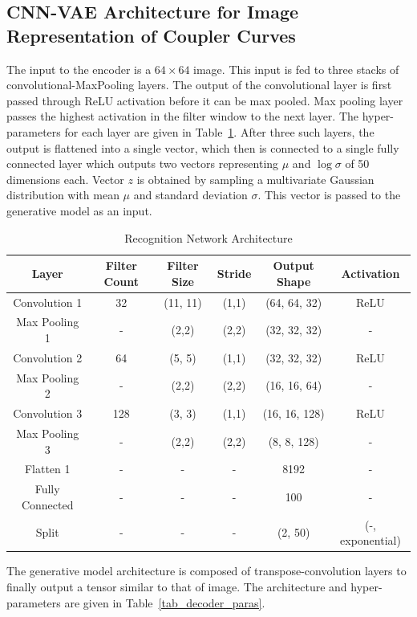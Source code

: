 \subsection{CNN-VAE Architecture for Image Representation of Coupler Curves}
The input to the encoder is a $64\times64$ image. This input is fed to three stacks of convolutional-MaxPooling layers. The output of the convolutional layer is first passed through ReLU activation before it can be max pooled. Max pooling layer passes the highest activation in the filter window to the next layer. The hyper-parameters for each layer are given in Table~\ref{tab_encoder_paras}. After three such layers, the output is flattened into a single vector, which then is connected to a single fully connected layer which outputs two vectors representing $\mu$ and $\log\sigma$ of 50 dimensions each. Vector $z$ is obtained by sampling a multivariate Gaussian distribution with mean $\mu$ and standard deviation $\sigma$. This vector is passed to the generative model as an input.

\begin{table}
  \caption{Recognition Network Architecture}
\centering
\label{tab_encoder_paras}
\begin{tabular}{cccccc}
\hline
  Layer & Filter Count & Filter Size & Stride & Output Shape & Activation\\
\hline
  Convolution 1 & 32 & (11, 11) & (1,1) & (64, 64, 32) & ReLU \\
  Max Pooling 1 & - & (2,2) & (2,2) & (32, 32, 32) & -  \\
  Convolution 2 & 64 & (5, 5) & (1,1) & (32, 32, 32) & ReLU   \\
  Max Pooling 2 & - & (2,2) & (2,2) & (16, 16, 64) & - \\
  Convolution 3 & 128 & (3, 3) & (1,1) & (16, 16, 128) & ReLU   \\
  Max Pooling 3 & - & (2,2) & (2,2) & (8, 8, 128) & - \\
  Flatten 1 & - & - & - & 8192 & - \\
  Fully Connected & - & - & - & 100 & - \\
  Split & - & - & - & (2, 50) & (-, exponential) \\ \hline 
\end{tabular}
\end{table}



The generative model architecture is composed of transpose-convolution layers to finally output a tensor similar to that of image. The architecture and hyper-parameters are given in Table~\ref{tab_decoder_paras}.


